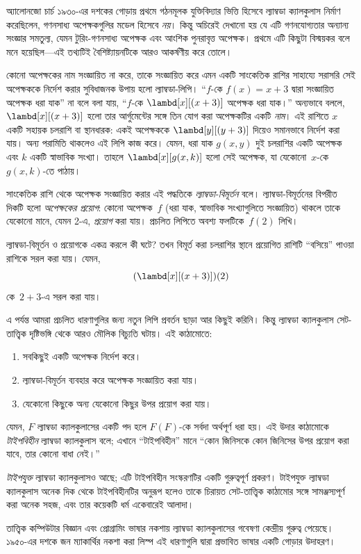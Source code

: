 \documentclass[../../../include/open-logic-section]{subfiles}
\begin{document}

অ্যালোনজো চার্চ ১৯৩০-এর দশকের গোড়ায় প্রথমে গঠনমূলক যুক্তিবিদ্যার ভিত্তি
হিসেবে ল্যাম্বডা ক্যালকুলাস নির্মাণ করেছিলেন, গণনসাধ্য অপেক্ষকগুলির মডেল
হিসেবে \emph{নয়}। কিন্তু অচিরেই দেখানো হয় যে এটি গণনযোগ্যতার অন্যান্য
সংজ্ঞার সমতুল্য, যেমন টুরিং-গণনসাধ্য অপেক্ষক এবং আংশিক পুনরাবৃত্ত অপেক্ষক।
প্রথমে এটি কিছুটা বিস্ময়কর বলে মনে হয়েছিল—এই তথ্যটিই বৈশিষ্ট্যায়নটিকে আরও
আকর্ষণীয় করে তোলে।

কোনো অপেক্ষকের নাম সংজ্ঞায়িত না করে, তাকে সংজ্ঞায়িত করে এমন একটি সাংকেতিক
রাশির সাহায্যে সরাসরি সেই অপেক্ষককে নির্দেশ করার সুবিধাজনক উপায় হলো
ল্যাম্বডা-লিপি। ``$f$-কে $f(x) = x + 3$ দ্বারা সংজ্ঞায়িত অপেক্ষক ধরা যাক''
না বলে বলা যায়, ``$f$-কে $\lambd[x][(x + 3)]$ অপেক্ষক ধরা যাক।'' অন্যভাবে
বললে, $\lambd[x][(x+3)]$ হলো তার আর্গুমেন্টের সঙ্গে তিন যোগ করা অপেক্ষকটির
একটি \emph{নাম}। এই রাশিতে $x$ একটি সহায়ক চলরাশি বা স্থানধারক: একই
অপেক্ষককে $\lambd[y][(y + 3)]$ দিয়েও সমানভাবে নির্দেশ করা যায়। অন্য
পরামিতি থাকলেও এই লিপি কাজ করে। যেমন, ধরা যাক $g(x, y)$ দুই চলরাশির একটি
অপেক্ষক এবং $k$ একটি স্বাভাবিক সংখ্যা। তাহলে $\lambd[x][g(x,k)]$ হলো সেই
অপেক্ষক, যা যেকোনো~$x$-কে~$g(x, k)$-তে পাঠায়।

সাংকেতিক রাশি থেকে অপেক্ষক সংজ্ঞায়িত করার এই পদ্ধতিকে
\emph{ল্যাম্বডা-বিমূর্তন} বলে। ল্যাম্বডা-বিমূর্তনের বিপরীত দিকটি হলো
\emph{অপেক্ষকের প্রয়োগ}: কোনো অপেক্ষক~$f$ (ধরা যাক, স্বাভাবিক সংখ্যাগুলিতে
সংজ্ঞায়িত) থাকলে তাকে যেকোনো মানে, যেমন 2-এ, \emph{প্রয়োগ} করা যায়।
প্রচলিত লিপিতে অবশ্য ফলটিকে~$f(2)$ লিখি।

ল্যাম্বডা-বিমূর্তন ও প্রয়োগকে একত্র করলে কী ঘটে? তখন বিমূর্ত করা চলরাশির
স্থানে প্রয়োগিত রাশিটি ``বসিয়ে'' পাওয়া রাশিকে সরল করা যায়। যেমন,
\[
(\lambd[x][(x + 3)])(2)
\]
কে~$2 + 3$-এ সরল করা যায়।

এ পর্যন্ত আমরা প্রচলিত ধারণাগুলির জন্য নতুন লিপি প্রবর্তন ছাড়া আর কিছুই
করিনি। কিন্তু ল্যাম্বডা ক্যালকুলাস সেট-তাত্ত্বিক দৃষ্টিভঙ্গি থেকে আরও মৌলিক
বিচ্যুতি ঘটায়। এই কাঠামোতে:
\begin{enumerate}
\item সবকিছুই একটি অপেক্ষক নির্দেশ করে।
\item ল্যাম্বডা-বিমূর্তন ব্যবহার করে অপেক্ষক সংজ্ঞায়িত করা যায়।
\item যেকোনো কিছুকে অন্য যেকোনো কিছুর উপর প্রয়োগ করা যায়।
\end{enumerate}
যেমন, $F$ ল্যাম্বডা ক্যালকুলাসের একটি পদ হলে $F(F)$-কে সর্বদা অর্থপূর্ণ
ধরা হয়। এই উদার কাঠামোকে \emph{টাইপবিহীন} ল্যাম্বডা ক্যালকুলাস বলে;
এখানে ``টাইপবিহীন'' মানে ``কোন জিনিসকে কোন জিনিসের উপর প্রয়োগ করা যাবে,
তার কোনো বাধা নেই।''

\begin{digress}
\emph{টাইপযুক্ত} ল্যাম্বডা ক্যালকুলাসও আছে; এটি টাইপবিহীন সংস্করণটির
একটি গুরুত্বপূর্ণ প্রকরণ। টাইপযুক্ত ল্যাম্বডা ক্যালকুলাস অনেক দিক থেকে
টাইপবিহীনটির অনুরূপ হলেও তাকে চিরায়ত সেট-তাত্ত্বিক কাঠামোর সঙ্গে সামঞ্জস্যপূর্ণ
করা অনেক সহজ, এবং তার কয়েকটি ধর্ম একেবারেই আলাদা।

তাত্ত্বিক কম্পিউটার বিজ্ঞান এবং প্রোগ্রামিং ভাষার নকশায় ল্যাম্বডা ক্যালকুলাসের
গবেষণা কেন্দ্রীয় গুরুত্ব পেয়েছে। ১৯৫০-এর দশকে জন ম্যাকার্থির নকশা করা
লিস্প এই ধারণাগুলি দ্বারা প্রভাবিত ভাষার একটি গোড়ার উদাহরণ।
\end{digress}
\end{document}
